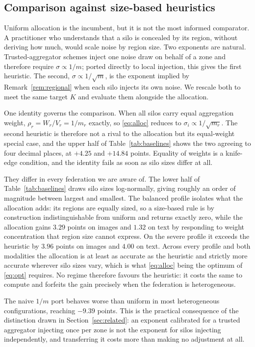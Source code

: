 \documentclass[acmsmall,screen,review,anonymous]{acmart}
\theoremstyle{acmdefinition}%
\begin{document}
\subsection{Comparison against size-based heuristics}

Uniform allocation is the incumbent, but it is not the most informed comparator. A
practitioner who understands that a silo is concealed by its region, without
deriving how much, would scale noise by region size. Two exponents are natural.
Trusted-aggregator schemes inject one noise draw on behalf of a zone and therefore
require $\sigma \propto 1/m$; ported directly to local injection, this gives the
first heuristic. The second, $\sigma \propto 1/\sqrt{m}$, is the exponent implied
by Remark~\ref{rem:regional} when each silo injects its own noise. We rescale both
to meet the same target $K$ and evaluate them alongside the allocation.

One identity governs the comparison. When all silos carry equal aggregation
weight, $\rho_r = W_r/V_r = 1/m_r$ exactly, so \eqref{eq:alloc} reduces to
$\sigma_i \propto 1/\sqrt{m_r}$. The second heuristic is therefore not a rival to
the allocation but its equal-weight special case, and the upper half of
Table~\ref{tab:baselines} shows the two agreeing to four decimal places, at
$+4.25$ and $+14.84$ points. Equality of weights is a knife-edge condition, and
the identity fails as soon as silo sizes differ at all.

They differ in every federation we are aware of. The lower half of
Table~\ref{tab:baselines} draws silo sizes log-normally, giving roughly an order
of magnitude between largest and smallest. The balanced profile isolates what
the allocation adds: its regions are equally sized, so a size-based rule is by
construction indistinguishable from uniform and returns exactly zero, while the
allocation gains $3.29$ points on images and $1.32$ on text by responding to weight
concentration that region size cannot express. On the severe profile it exceeds the
heuristic by $3.96$ points on images and $4.00$ on text. Across every profile and both modalities the
allocation is at least as accurate as the heuristic and strictly more accurate
wherever silo sizes vary, which is what \eqref{eq:alloc} being the optimum of
\eqref{eq:opt} requires. No regime therefore favours the heuristic: it costs the
same to compute and forfeits the gain precisely when the federation is
heterogeneous.

The naive $1/m$ port behaves worse than uniform in most heterogeneous
configurations, reaching $-9.39$ points. This is the practical consequence of the
distinction drawn in Section~\ref{sec:related}: an exponent calibrated for a
trusted aggregator injecting once per zone is not the exponent for silos injecting
independently, and transferring it costs more than making no adjustment at all.
\end{document}
